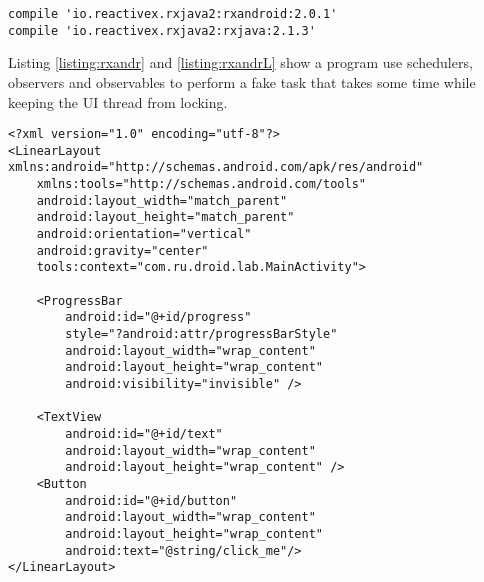 \begin{lstlisting}[style=A_txt]
compile 'io.reactivex.rxjava2:rxandroid:2.0.1'
compile 'io.reactivex.rxjava2:rxjava:2.1.3'
\end{lstlisting}

Listing \ref{listing:rxandr} and \ref{listing:rxandrL} show a program use schedulers, observers and observables to perform a fake task that takes some time while keeping the UI thread from locking. 

\begin{lstlisting}[style=A_XML, caption={Layout for RxAndroid example}, label={listing:rxandrL}]
<?xml version="1.0" encoding="utf-8"?>
<LinearLayout xmlns:android="http://schemas.android.com/apk/res/android"
    xmlns:tools="http://schemas.android.com/tools"
    android:layout_width="match_parent"
    android:layout_height="match_parent"
    android:orientation="vertical"
    android:gravity="center"
    tools:context="com.ru.droid.lab.MainActivity">

    <ProgressBar
        android:id="@+id/progress"
        style="?android:attr/progressBarStyle"
        android:layout_width="wrap_content"
        android:layout_height="wrap_content"
        android:visibility="invisible" />

    <TextView
        android:id="@+id/text"
        android:layout_width="wrap_content"
        android:layout_height="wrap_content" />
    <Button
        android:id="@+id/button"
        android:layout_width="wrap_content"
        android:layout_height="wrap_content"
        android:text="@string/click_me"/>
</LinearLayout>
\end{lstlisting}

